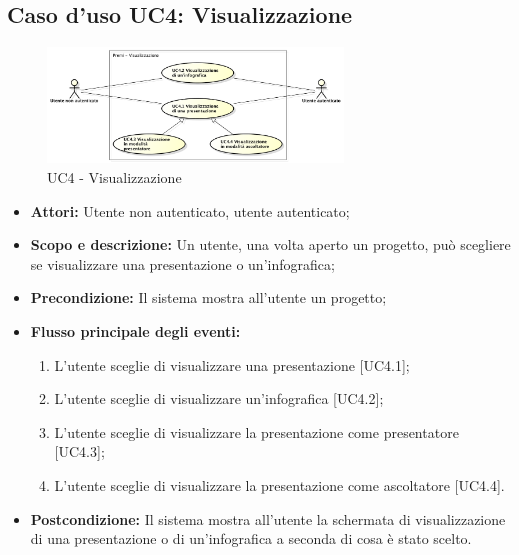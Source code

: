 \subsection{Caso d'uso UC4: Visualizzazione}
\begin{figure}[h] 
	\centering 
	\includegraphics[width=0.7\textwidth] {img/UC4.png}
	\caption{UC4 - Visualizzazione} 
\end{figure}

\begin{itemize}
	\item \textbf{Attori:} Utente non autenticato, utente autenticato;
	\item \textbf{Scopo e descrizione:} Un utente, una volta aperto un progetto, può scegliere se visualizzare una presentazione o un'\gls{infografica};
	\item \textbf{Precondizione:} Il sistema mostra all'utente un progetto;
	\item \textbf{Flusso principale degli eventi:}
	\begin{enumerate}
		\item L'utente sceglie di visualizzare una presentazione [UC4.1];
		\item L'utente sceglie di visualizzare un'\gls{infografica} [UC4.2];
		\item L'utente sceglie di visualizzare la presentazione come presentatore [UC4.3];
		\item L'utente sceglie di visualizzare la presentazione come ascoltatore [UC4.4].
	\end{enumerate}
	\item \textbf{Postcondizione:} Il sistema mostra all'utente la schermata di visualizzazione di una presentazione o di un'\gls{infografica} a seconda di cosa è stato scelto.
\end{itemize}

